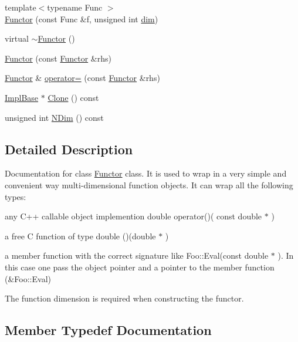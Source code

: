 \begin{DoxyCompactItemize}
\item 
{\footnotesize template$<$typename Func $>$ }\\\mbox{\hyperlink{classROOT_1_1Math_1_1Functor_a82af0df828055f18310af5d49dcc3aa2}{Functor}} (const Func \&f, unsigned int \mbox{\hyperlink{irrep__util_8cc_a70b5e28b5bc3d1b63a7435c5fe50b837}{dim}})
\item 
virtual \mbox{\hyperlink{classROOT_1_1Math_1_1Functor_a349935f827a453deb17fdad728849028}{$\sim$\+Functor}} ()
\item 
\mbox{\hyperlink{classROOT_1_1Math_1_1Functor_a001bfe27e95032f05685167e77e0efbd}{Functor}} (const \mbox{\hyperlink{classROOT_1_1Math_1_1Functor}{Functor}} \&rhs)
\item 
\mbox{\hyperlink{classROOT_1_1Math_1_1Functor}{Functor}} \& \mbox{\hyperlink{classROOT_1_1Math_1_1Functor_a24bd9cdf7e31e443bff64c5fb4378c99}{operator=}} (const \mbox{\hyperlink{classROOT_1_1Math_1_1Functor}{Functor}} \&rhs)
\item 
\mbox{\hyperlink{classROOT_1_1Math_1_1Functor_acc5dacb213f26296122e95138f5153b3}{Impl\+Base}} $\ast$ \mbox{\hyperlink{classROOT_1_1Math_1_1Functor_a989f9b6dd160ebe03911cdee00dacaad}{Clone}} () const
\item 
unsigned int \mbox{\hyperlink{classROOT_1_1Math_1_1Functor_a2544e2ed3c6a0420084c7b08eb3c3130}{N\+Dim}} () const
\end{DoxyCompactItemize}


\subsection{Detailed Description}
Documentation for class \mbox{\hyperlink{classROOT_1_1Math_1_1Functor}{Functor}} class. It is used to wrap in a very simple and convenient way multi-\/dimensional function objects. It can wrap all the following types\+: 
\begin{DoxyItemize}
\item any C++ callable object implemention double operator()( const double $\ast$  ) 
\item a free C function of type double ()(double $\ast$ ) 
\item a member function with the correct signature like Foo\+::\+Eval(const double $\ast$ ). In this case one pass the object pointer and a pointer to the member function (\&Foo\+::\+Eval) 
\end{DoxyItemize}The function dimension is required when constructing the functor. 

\subsection{Member Typedef Documentation}
\mbox{\label{classROOT_1_1Math_1_1Functor_aef374d72e63fb0fea13a8cc3d4f2091b}} 
